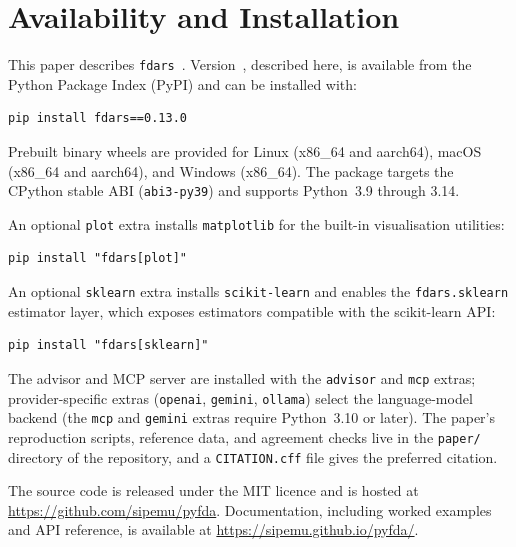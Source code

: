 \section{Availability and Installation}
\label{sec:availability}

This paper describes \texttt{fdars}~\FdarsVersion{}.  Version~\FdarsVersion{},
described here, is available from the Python Package Index (PyPI) and can be
installed with:
\begin{verbatim}
pip install fdars==0.13.0
\end{verbatim}
Prebuilt binary wheels are provided for Linux (x86\_64 and aarch64), macOS
(x86\_64 and aarch64), and Windows (x86\_64).
The package targets the CPython stable ABI (\texttt{abi3-py39}) and supports
Python~3.9 through 3.14.

An optional \texttt{plot} extra installs \texttt{matplotlib} for the built-in
visualisation utilities:
\begin{verbatim}
pip install "fdars[plot]"
\end{verbatim}
An optional \texttt{sklearn} extra installs \texttt{scikit-learn} and enables
the \texttt{fdars.sklearn} estimator layer, which exposes \nsklearnestimators{}
estimators compatible with the scikit-learn API:
\begin{verbatim}
pip install "fdars[sklearn]"
\end{verbatim}

The advisor and MCP server are installed with the \texttt{advisor} and
\texttt{mcp} extras; provider-specific extras (\texttt{openai},
\texttt{gemini}, \texttt{ollama}) select the language-model backend (the
\texttt{mcp} and \texttt{gemini} extras require Python~3.10 or later).
The paper's reproduction scripts, reference data, and agreement checks live in
the \texttt{paper/} directory of the repository, and a \texttt{CITATION.cff}
file gives the preferred citation.

The source code is released under the MIT licence and is hosted at
\url{https://github.com/sipemu/pyfda}.
Documentation, including worked examples and API reference, is available at
\url{https://sipemu.github.io/pyfda/}.
